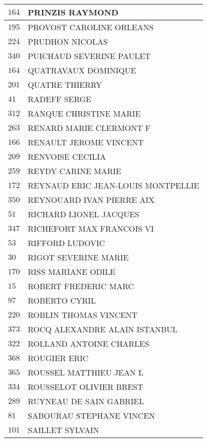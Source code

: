\begin{xltabular}{\linewidth}{|l|X|}
    \hline
    $164$ & PRINZIS RAYMOND \\
    \hline
    $195$ & PROVOST CAROLINE ORLEANS \\
    \hline
    $224$ & PRUDHON NICOLAS \\
    \hline
    $340$ & PUICHAUD SEVERINE PAULET \\
    \hline
    $164$ & QUATRAVAUX DOMINIQUE \\
    \hline
    $201$ & QUATRE THIERRY \\
    \hline
    $41$ & RADEFF SERGE \\
    \hline
    $312$ & RANQUE CHRISTINE MARIE \\
    \hline
    $263$ & RENARD MARIE CLERMONT F \\
    \hline
    $166$ & RENAULT JEROME VINCENT \\
    \hline
    $209$ & RENVOISE CECILIA \\
    \hline
    $259$ & REYDY CARINE MARIE \\
    \hline
    $172$ & REYNAUD ERIC JEAN-LOUIS MONTPELLIE \\
    \hline
    $350$ & REYNOUARD IVAN PIERRE AIX \\
    \hline
    $51$ & RICHARD LIONEL JACQUES \\
    \hline
    $347$ & RICHEFORT MAX FRANCOIS VI \\
    \hline
    $53$ & RIFFORD LUDOVIC \\
    \hline
    $30$ & RIGOT SEVERINE MARIE \\
    \hline
    $170$ & RISS MARIANE ODILE \\
    \hline
    $15$ & ROBERT FREDERIC MARC \\
    \hline
    $97$ & ROBERTO CYRIL \\
    \hline
    $220$ & ROBLIN THOMAS VINCENT \\
    \hline
    $373$ & ROCQ ALEXANDRE ALAIN ISTANBUL \\
    \hline
    $322$ & ROLLAND ANTOINE CHARLES \\
    \hline
    $368$ & ROUGIER ERIC \\
    \hline
    $365$ & ROUSSEL MATTHIEU JEAN L \\
    \hline
    $334$ & ROUSSELOT OLIVIER BREST \\
    \hline
    $289$ & RUYNEAU DE SAIN GABRIEL \\
    \hline
    $81$ & SABOURAU STEPHANE VINCEN \\
    \hline
    $101$ & SAILLET SYLVAIN \\

\end{xltabular}

